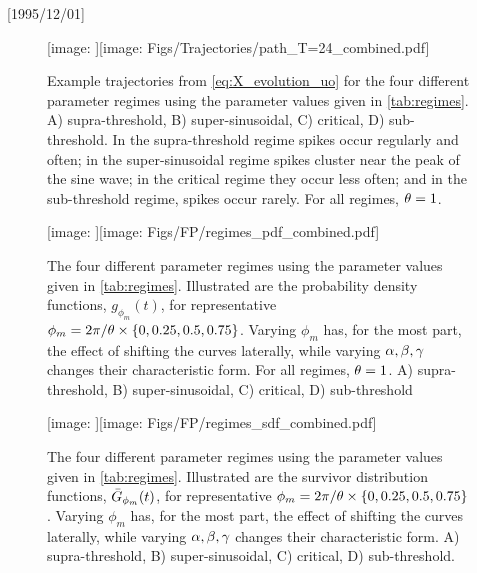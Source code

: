 \NeedsTeXFormat{LaTeX2e}[1995/12/01] \documentclass[10pt]{bmc_article}
\newenvironment{bmcformat}{\begin{raggedright}\baselineskip20pt\sloppy\setboolean{publ}{false}}{\end{raggedright}\baselineskip20pt\sloppy}
\begin{document}
\begin{bmcformat}
\def \includegraphic{}
\def \texttt{[image: ]}
\renewcommand{\includegraphic}[2][width = 1\textwidth]{}
\renewcommand{\includegraphics}[2][width = 1\textwidth]{}
\begin{figure}[ht] 
\begin{center} 
\texttt{[image: Figs/Trajectories/path\_T=24\_combined.pdf]} 
\end{center} 
\caption{Example trajectories from \cref{eq:X_evolution_uo} for 
the four different parameter regimes using the parameter values given in 
\cref{tab:regimes}. A) supra-threshold, B) super-sinusoidal, C) critical, D) 
sub-threshold. In the supra-threshold regime 
spikes occur regularly and often; in the super-sinusoidal regime 
spikes cluster near the peak of the sine wave; in the critical regime 
they occur less often; and in the sub-threshold regime, spikes occur 
rarely. For all regimes, ${\theta} = 1$.}  
\label{fig:trajectory_examples}     
\end{figure} 
\begin{figure}[ht] 
\begin{center} 
\texttt{[image: Figs/FP/regimes\_pdf\_combined.pdf]} 
\caption{The four different parameter regimes using the parameter values given in 
\cref{tab:regimes}. Illustrated are the 
probability density functions, $g_{\phi_m}(t)$, for representative $\phi_m = 
2\pi/{\theta} \times \{0,0.25,0.5,0.75\}$.  
Varying $\phi_m$ has, 
 for the most part, the effect of shifting the curves laterally,  
 while varying ${{\alpha},{\beta},{\gamma } }$ changes their characteristic form. For all regimes, ${\theta} 
 = 1$. 
 A) supra-threshold, B) super-sinusoidal, C) critical, D) sub-threshold} 
\label{fig:4regimes_illustrated_PDF}   
\end{center}       
\end{figure}              
\begin{figure}[ht]     
\begin{center}  
\texttt{[image: Figs/FP/regimes\_sdf\_combined.pdf]} 
\caption{The four different parameter regimes using the parameter values given in 
\cref{tab:regimes}. Illustrated are the survivor 
distribution functions, ${ \bar{G} }_{\phi_m}(t)$, for representative $\phi_m = 2\pi/{\theta} 
\times \{0,0.25,0.5,0.75\}$. Varying $\phi_m$ has, for the most part, the effect 
of shifting the curves laterally, while varying ${{\alpha},{\beta},{\gamma } }$ changes their 
characteristic form. 
A) supra-threshold, B) super-sinusoidal, C) critical, D) sub-threshold.} 
\label{fig:4regimes_illustrated_SDF}     
\end{center} 

\end{figure}
\end{bmcformat}
\end{document}

